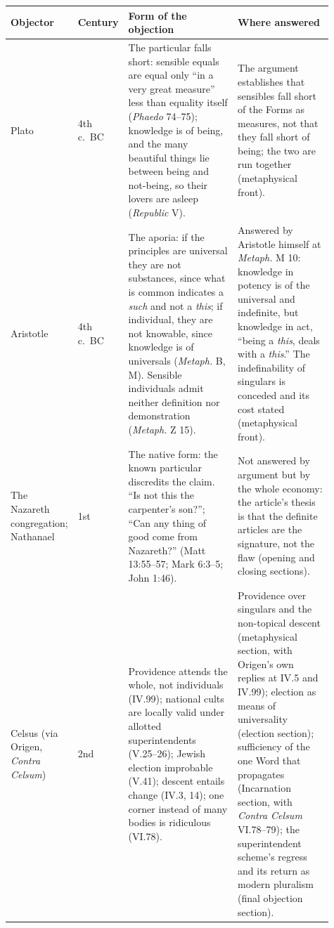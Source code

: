 \begin{longtable}{>{\raggedright\arraybackslash}p{0.14\linewidth}>{\raggedright\arraybackslash}p{0.10\linewidth}>{\raggedright\arraybackslash}p{0.36\linewidth}>{\raggedright\arraybackslash}p{0.31\linewidth}}
\toprule
\textbf{Objector} & \textbf{Century} & \textbf{Form of the objection} & \textbf{Where answered}\\
\midrule
\endhead
\bottomrule
\endfoot
Plato & 4th c.\ BC & The particular falls short: sensible equals are equal only ``in a very great measure'' less than equality itself (\emph{Phaedo} 74--75); knowledge is of being, and the many beautiful things lie between being and not-being, so their lovers are asleep (\emph{Republic} V). & The argument establishes that sensibles fall short of the Forms as measures, not that they fall short of being; the two are run together (metaphysical front).\\
Aristotle & 4th c.\ BC & The aporia: if the principles are universal they are not substances, since what is common indicates a \emph{such} and not a \emph{this}; if individual, they are not knowable, since knowledge is of universals (\emph{Metaph.} B, M). Sensible individuals admit neither definition nor demonstration (\emph{Metaph.} Z 15). & Answered by Aristotle himself at \emph{Metaph.} M 10: knowledge in potency is of the universal and indefinite, but knowledge in act, ``being a \emph{this}, deals with a \emph{this}.'' The indefinability of singulars is conceded and its cost stated (metaphysical front).\\
The Nazareth congregation; Nathanael & 1st & The native form: the known particular discredits the claim. ``Is not this the carpenter's son?''; ``Can any thing of good come from Nazareth?'' (Matt 13:55--57; Mark 6:3--5; John 1:46). & Not answered by argument but by the whole economy: the article's thesis is that the definite articles are the signature, not the flaw (opening and closing sections).\\
Celsus (via Origen, \emph{Contra Celsum}) & 2nd & Providence attends the whole, not individuals (IV.99); national cults are locally valid under allotted superintendents (V.25--26); Jewish election improbable (V.41); descent entails change (IV.3, 14); one corner instead of many bodies is ridiculous (VI.78). & Providence over singulars and the non-topical descent (metaphysical section, with Origen's own replies at IV.5 and IV.99); election as means of universality (election section); sufficiency of the one Word that propagates (Incarnation section, with \emph{Contra Celsum} VI.78--79); the superintendent scheme's regress and its return as modern pluralism (final objection section).\\

\end{longtable}
